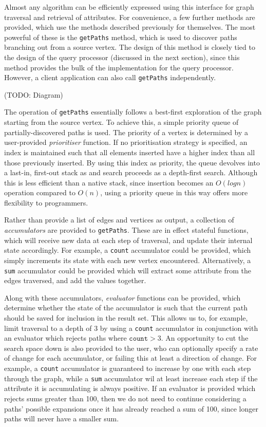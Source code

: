 Almost any algorithm can be efficiently expressed using this interface for
graph traversal and retrieval of attributes. For convenience, a few further methods
are provided, which use the methods described previously for themselves. The most
powerful of these is the \texttt{getPaths} method, which is used to discover
paths branching out from a source vertex. The design of this method is
closely tied to the design of the query processor (discussed in the next
section), since this method provides the bulk of the implementation for the
query processor. However, a client application can also call \texttt{getPaths}
independently.

(TODO: Diagram)

The operation of \texttt{getPaths} essentially follows a best-first
exploration of the graph starting from the source vertex. To achieve this, a
simple priority queue of partially-discovered paths is used. The priority of a
vertex is determined by a user-provided \textit{prioritiser} function. If no
prioritisation strategy is specified, an index is maintained such that all
elements inserted have a higher index than all those previously inserted. By
using this index as priority, the queue devolves into a last-in, first-out
stack as and search proceeds as a depth-first search. Although this is less
efficient than a native stack, since insertion becomes an $O(log n)$ operation
compared to $O(n)$, using a priority queue in this way offers more flexibility
to programmers.

Rather than provide a list of edges and vertices as output, a collection of
\textit{accumulators} are provided to \texttt{getPaths}. These are in effect
stateful functions, which  will receive new data at each step of traversal,
and update their internal state accordingly. For example, a \texttt{count}
accumulator could be provided, which simply increments its state with each new
vertex encountered. Alternatively, a \texttt{sum} accumulator could be
provided which will extract some attribute from the edges traversed, and add
the values together.

Along with these accumulators, \textit{evaluator} functions can be provided,
which determine whether the state of the accumulator is such that the current
path should be saved for inclusion in the result set. This allows us to, for
example, limit traversal to a depth of 3 by using a \texttt{count} accumulator
in conjunction with an evaluator which rejects paths where $\texttt{count}>3$.
An opportunity to cut the search space down is also provided to the user, who
can optionally specify  a rate of change for each accumulator, or failing this
at least a direction of change. For example, a \texttt{count} accumulator is
guaranteed to increase by one with each step through the graph, while a
\texttt{sum} accumulator wil at least increase each step if the attribute it
is accumulating is always positive. If an evaluator is provided which rejects
sums greater than 100, then we do not need to continue considering a paths'
possible expansions once it has already reached a sum of 100, since longer
paths will never have a smaller sum.

